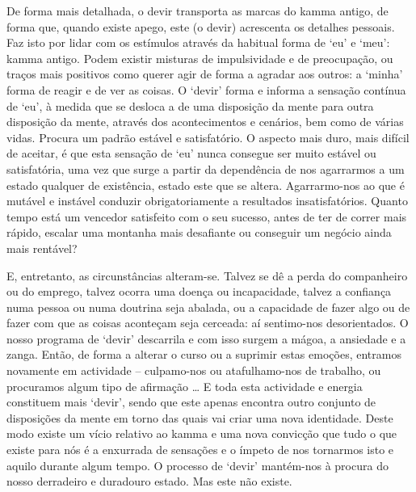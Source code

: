 De forma mais detalhada, o devir transporta as marcas do kamma antigo, de forma que, quando existe apego, este (o devir) acrescenta os detalhes pessoais. Faz isto por lidar com os estímulos através da habitual forma de `eu' e `meu': kamma antigo. Podem existir misturas de impulsividade e de preocupação, ou traços mais positivos como querer agir de forma a agradar aos outros: a `minha' forma de reagir e de ver as coisas. O `devir' forma e informa a sensação contínua de `eu', à medida que se desloca a de uma disposição da mente para outra disposição da mente, através dos acontecimentos e cenários, bem como de várias vidas. Procura um padrão estável e satisfatório. O aspecto mais duro, mais difícil de aceitar, é que esta sensação de `eu' nunca consegue ser muito estável ou satisfatória, uma vez que surge a partir da dependência de nos agarrarmos a um estado qualquer de existência, estado este que se altera. Agarrarmo-nos ao que é mutável e instável conduzir obrigatoriamente a resultados insatisfatórios. Quanto tempo está um vencedor satisfeito com o seu sucesso, antes de ter de correr mais rápido, escalar uma montanha mais desafiante ou conseguir um negócio ainda mais rentável?

E, entretanto, as circunstâncias alteram-se. Talvez se dê a perda do companheiro ou do emprego, talvez ocorra uma doença ou incapacidade, talvez a confiança numa pessoa ou numa doutrina seja abalada, ou a capacidade de fazer algo ou de fazer com que as coisas aconteçam seja cerceada: aí sentimo-nos desorientados. O nosso programa de `devir' descarrila e com isso surgem a mágoa, a ansiedade e a zanga. Então, de forma a alterar o curso ou a suprimir estas emoções, entramos novamente em actividade -- culpamo-nos ou atafulhamo-nos de trabalho, ou procuramos algum tipo de afirmação \ldots{} E toda esta actividade e energia constituem mais `devir', sendo que este apenas encontra outro conjunto de disposições da mente em torno das quais vai criar uma nova identidade. Deste modo existe um vício relativo ao kamma e uma nova convicção que tudo o que existe para nós é a enxurrada de sensações e o ímpeto de nos tornarmos isto e aquilo durante algum tempo. O processo de `devir' mantém-nos à procura do nosso derradeiro e duradouro estado. Mas este não existe.

